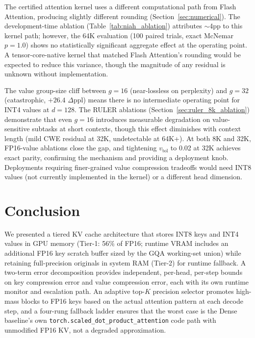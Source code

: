 \documentclass[11pt,a4paper]{article}
\theoremstyle{definition}
\theoremstyle{remark}
\newcommand{\torchsdpa}{\texttt{torch.scaled\_dot\_\hspace{0pt}product\_attention}}
\begin{document}
The certified attention kernel uses a different computational path from Flash Attention, producing slightly different rounding (Section~\ref{sec:numerical}).  The development-time ablation (Table~\ref{tab:niah_ablation}) attributes $\sim$4pp to this kernel path; however, the 64K evaluation (100 paired trials, exact McNemar $p{=}1.0$) shows no statistically significant aggregate effect at the operating point.  A tensor-core-native kernel that matched Flash Attention's rounding would be expected to reduce this variance, though the magnitude of any residual is unknown without implementation.

The value group-size cliff between $g{=}16$ (near-lossless on perplexity) and $g{=}32$ (catastrophic, $+26.4$ $\Delta$ppl) means there is no intermediate operating point for INT4 values at $d{=}128$.  The RULER ablations (Section~\ref{sec:ruler_8k_ablation}) demonstrate that even $g{=}16$ introduces measurable degradation on value-sensitive subtasks at short contexts, though this effect diminishes with context length (mild CWE residual at 32K, undetectable at 64K+).  At both 8K and 32K, FP16-value ablations close the gap, and tightening $v_{\mathrm{tol}}$ to 0.02 at 32K achieves exact parity, confirming the mechanism and providing a deployment knob.  Deployments requiring finer-grained value compression tradeoffs would need INT8 values (not currently implemented in the kernel) or a different head dimension.


\section{Conclusion}
\label{sec:conclusion}

We presented a tiered KV cache architecture that stores INT8 keys and INT4 values in GPU memory (Tier-1: 56\% of FP16; runtime VRAM includes an additional FP16 key scratch buffer sized by the GQA working-set union) while retaining full-precision originals in system RAM (Tier-2) for runtime fallback.  A two-term error decomposition provides independent, per-head, per-step bounds on key compression error and value compression error, each with its own runtime monitor and escalation path.  An adaptive top-$K$ precision selector promotes high-mass blocks to FP16 keys based on the actual attention pattern at each decode step, and a four-rung fallback ladder ensures that the worst case is the Dense baseline's own \torchsdpa{} code path with unmodified FP16 KV, not a degraded approximation.
\end{document}
